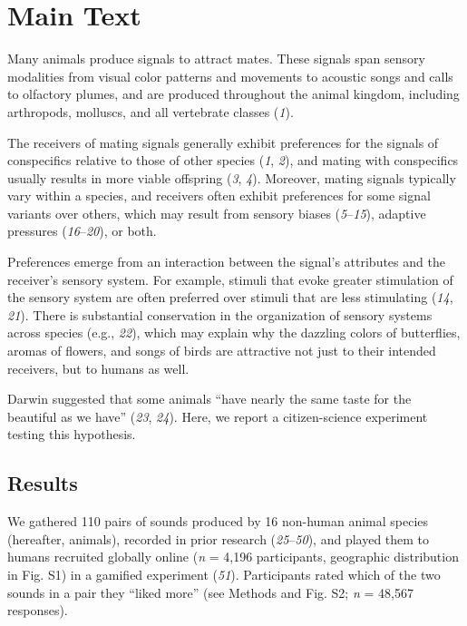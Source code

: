 \documentclass[
]{article}
\begin{document}
\section{Main Text}\label{main-text}

Many animals produce signals to attract mates. These signals span
sensory modalities from visual color patterns and movements to acoustic
songs and calls to olfactory plumes, and are produced throughout the
animal kingdom, including arthropods, molluscs, and all vertebrate
classes (\emph{1}).

The receivers of mating signals generally exhibit preferences for the
signals of conspecifics relative to those of other species (\emph{1},
\emph{2}), and mating with conspecifics usually results in more viable
offspring (\emph{3}, \emph{4}). Moreover, mating signals typically vary
within a species, and receivers often exhibit preferences for some
signal variants over others, which may result from sensory biases
(\emph{5}--\emph{15}), adaptive pressures (\emph{16}--\emph{20}), or
both.

Preferences emerge from an interaction between the signal's attributes
and the receiver's sensory system. For example, stimuli that evoke
greater stimulation of the sensory system are often preferred over
stimuli that are less stimulating (\emph{14}, \emph{21}). There is
substantial conservation in the organization of sensory systems across
species (e.g., \emph{22}), which may explain why the dazzling colors of
butterflies, aromas of flowers, and songs of birds are attractive not
just to their intended receivers, but to humans as well.

Darwin suggested that some animals ``have nearly the same taste for the
beautiful as we have'' (\emph{23}, \emph{24}). Here, we report a
citizen-science experiment testing this hypothesis.

\subsection{Results}\label{results}

We gathered 110 pairs of sounds produced by 16 non-human animal species
(hereafter, animals), recorded in prior research (\emph{25}--\emph{50}),
and played them to humans recruited globally online (\emph{n} = 4,196
participants, geographic distribution in Fig. S1) in a gamified
experiment (\emph{51}). Participants rated which of the two sounds in a
pair they ``liked more'' (see Methods and Fig. S2; \emph{n} = 48,567
responses).
\end{document}
